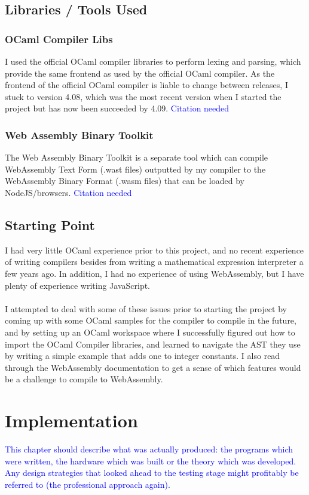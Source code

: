 \documentclass[12pt,twoside,notitlepage]{report}
\newcommand\note[1]{\textcolor{blue}{#1}}
\begin{document}

\section{Libraries / Tools Used}
\subsection{OCaml Compiler Libs}
I used the official OCaml compiler libraries to perform lexing and parsing, which provide the same frontend as used by the official OCaml compiler. As the frontend of the official OCaml compiler is liable to change between releases, I stuck to version 4.08, which was the most recent version when I started the project but has now been succeeded by 4.09.
\note{Citation needed}

\subsection{Web Assembly Binary Toolkit}
The Web Assembly Binary Toolkit is a separate tool which can compile WebAssembly Text Form (.wast files) outputted by my compiler to the WebAssembly Binary Format (.wasm files) that can be loaded by NodeJS/browsers.
\note{Citation needed}

\section{Starting Point}
I had very little OCaml experience prior to this project, and no recent experience of writing compilers besides from writing a mathematical expression interpreter a few years ago. In addition, I had no experience of using WebAssembly, but I have plenty of experience writing JavaScript.
\\\\
I attempted to deal with some of these issues prior to starting the project by coming up with some OCaml samples for the compiler to compile in the future, and by setting up an OCaml workspace where I successfully figured out how to import the OCaml Compiler libraries, and learned to navigate the AST they use by writing a simple example that adds one to integer constants. I also read through the WebAssembly documentation to get a sense of which features would be a challenge to compile to WebAssembly.

\clearpage
\chapter{Implementation}
\note{This chapter should describe what was actually produced: the programs which were written, the hardware which was built or the theory which was developed. Any design strategies that looked ahead to the testing stage might profitably be referred to (the professional approach again).}
\end{document}

